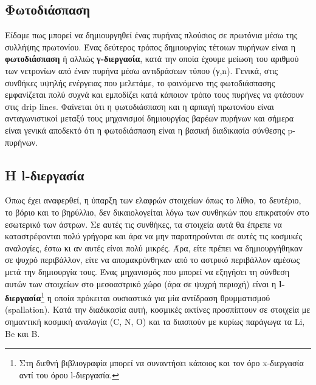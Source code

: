 \subsection{Φωτοδιάσπαση}
Είδαμε πως μπορεί να δημιουργηθεί ένας πυρήνας πλούσιος σε πρωτόνια μέσω της συλλήψης πρωτονίου. Ένας δεύτερος τρόπος δημιουργίας τέτοιων πυρήνων είναι η \textbf{φωτοδιάσπαση} ή αλλιώς \textbf{γ-διεργασία}, κατά την οποία έχουμε μείωση του αριθμού των νετρονίων από έναν πυρήνα μέσω αντιδράσεων τύπου (γ,n). Γενικά, στις συνθήκες υψηλής ενέργειας που μελετάμε, το φαινόμενο της φωτοδιάσπασης εμφανίζεται πολύ συχνά και εμποδίζει κατά κάποιον τρόπο τους πυρήνες να φτάσουν στις drip lines. 
Φαίνεται ότι η φωτοδιάσπαση και η αρπαγή πρωτονίου είναι ανταγωνιστικοί μεταξύ τους μηχανισμοί δημιουργίας βαρέων πυρήνων και σήμερα είναι γενικά αποδεκτό ότι η φωτοδιάσπαση είναι η βασική διαδικασία σύνθεσης p-πυρήνων.
\subsection{Η l-διεργασία}
Όπως έχει αναφερθεί, η ύπαρξη των ελαφρών στοιχείων όπως το λίθιο, το δευτέριο, το βόριο και το βηρύλλιο, δεν δικαιολογείται λόγω των συνθηκών που επικρατούν στο εσωτερικό των άστρων. Σε αυτές τις συνθήκες, τα στοιχεία αυτά θα έπρεπε να καταστρέφονται πολύ γρήγορα και άρα να μην παρατηρούνται σε αυτές τις κοσμικές αναλογίες, έστω κι αν αυτές είναι πολύ μικρές. Άρα, είτε πρέπει να δημιουργήθηκαν σε ψυχρό περιβάλλον, είτε να απομακρύνθηκαν από το αστρικό περιβάλλον αμέσως μετά την δημιουργία τους. 
Ένας μηχανισμός που μπορεί να εξηγήσει τη σύνθεση αυτών των στοιχείων στο μεσοαστρικό χώρο (άρα σε ψυχρή περιοχή) είναι η \textbf{ l-διεργασία}\footnote{Στη διεθνή βιβλιογραφία μπορεί να συναντήσει κάποιος και τον όρο x-διεργασία αντί του όρου l-διεργασία.} η οποία πρόκειται ουσιαστικά για μία αντίδραση θρυμματισμού (spallation). Κατά την διαδικασία αυτή, κοσμικές ακτίνες προσπίπτουν σε στοιχεία με σημαντική κοσμική αναλογία (C, N, O) και τα διασπούν με κυρίως παράγωγα τα Li, Be και Β.

